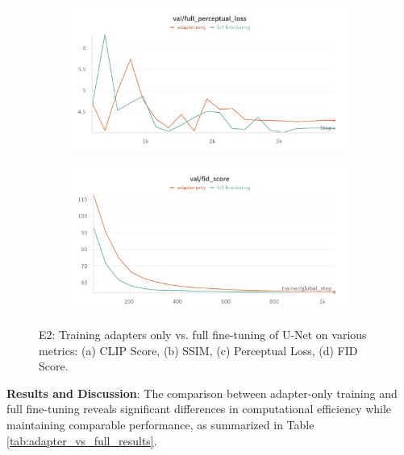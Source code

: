 \begin{figure}[htbp]
  \begin{subfigure}[b]{0.48\textwidth}
    \centering
    \includegraphics[width=\textwidth]{images/experiments/adapter_vs_full/perceptual.png}
    \label{fig:exp_adap_vs_full_perceptual}
  \end{subfigure}
  \hfill
  \begin{subfigure}[b]{0.48\textwidth}
    \centering
    \includegraphics[width=\textwidth]{images/experiments/adapter_vs_full/fid.png}
    \label{fig:exp_adap_vs_full_train_loss}
  \end{subfigure}

  \caption{E2: Training adapters only vs. full fine-tuning of U-Net on various metrics: (a) CLIP Score, (b) SSIM, (c) Perceptual Loss, (d) FID Score.}
  \label{fig:exp_adap_vs_full_metrics_grid}
\end{figure}

\textbf{Results and Discussion}:
The comparison between adapter-only training and full fine-tuning reveals significant differences in computational efficiency while maintaining comparable performance, as summarized in Table \ref{tab:adapter_vs_full_results}.

